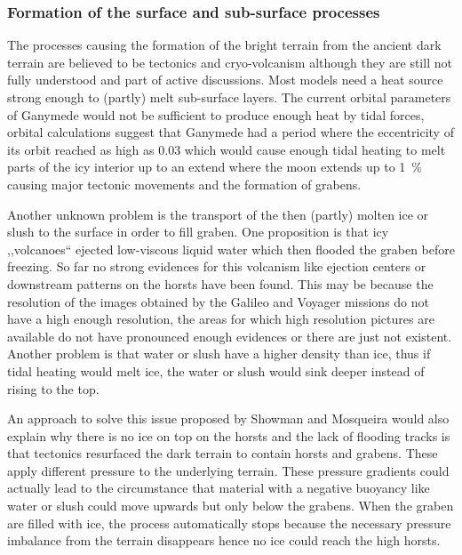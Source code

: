 \subsubsection{Formation of the surface and sub-surface processes\label{sub:volcanism}}

The processes causing the formation of the bright terrain from the
ancient dark terrain are believed to be tectonics and cryo-volcanism
although they are still not fully understood and part of active discussions\cite{Showman2004,Schenk2001,Patterson2010}.
Most models need a heat source strong enough to (partly) melt sub-surface
layers. The current orbital parameters of Ganymede would not be sufficient
to produce enough heat by tidal forces, orbital calculations suggest
that Ganymede had a period where the eccentricity of its orbit reached
as high as 0.03\cite{Showman1997} which would cause enough tidal
heating to melt parts of the icy interior up to an extend where the
moon extends up to 1~\% causing major tectonic movements and the
formation of grabens\cite{Showman2004}. 

Another unknown problem is the transport of the then (partly) molten
ice or slush to the surface in order to fill graben. One proposition
is that icy ,,volcanoes`` ejected low-viscous liquid water which
then flooded the graben before freezing. So far no strong evidences
for this volcanism like ejection centers or downstream patterns on
the horsts have been found\cite{Patterson2010}. This may be because
the resolution of the images obtained by the Galileo and Voyager missions
do not have a high enough resolution, the areas for which high resolution
pictures are available do not have pronounced enough evidences or
there are just not existent\cite{Patterson2010,Schenk2001,Showman2004}.
Another problem is that water or slush have a higher density than
ice, thus if tidal heating would melt ice, the water or slush would
sink deeper instead of rising to the top.

An approach to solve this issue proposed by Showman and Mosqueira
would also explain why there is no ice on top on the horsts and the
lack of flooding tracks is that tectonics resurfaced the dark terrain
to contain horsts and grabens. These apply different pressure to the
underlying terrain. These pressure gradients could actually lead to
the circumstance that material with a negative buoyancy like water
or slush could move upwards but only below the grabens. When the graben
are filled with ice, the process automatically stops because the necessary
pressure imbalance from the terrain disappears hence no ice could
reach the high horsts\cite{Showman2004}. 

